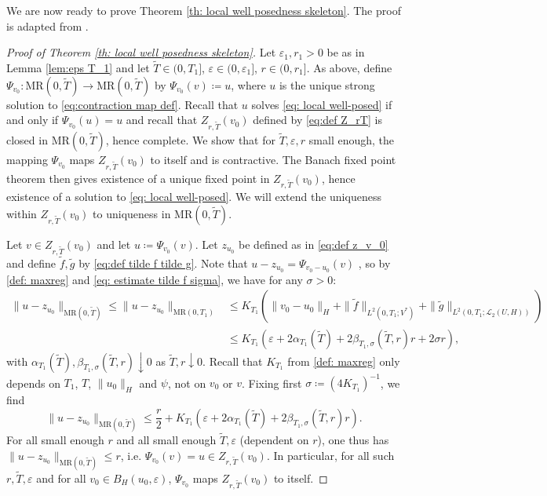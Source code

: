 \documentclass{amsart}
\renewcommand{\MR}{\mathrm{MR}}
\newcommand{\UH}{\mathcal{L}_2(U,H)}
\newcommand{\<}{\langle}
\newcommand{\?}{\rangle}
\theoremstyle{plain}
\theoremstyle{remark}
\theoremstyle{plain}
\numberwithin{equation}{section}
\newcommand{\eps}{\varepsilon}
\begin{document}
We are now ready to prove Theorem \ref{th: local well posedness skeleton}. The proof is adapted from \cite[Th. 18.2.6]{HNVWvolume3}.

\begin{proof}[Proof of Theorem \ref{th: local well posedness skeleton}]
Let  $\eps_1,r_1>0$ be as in Lemma \ref{lem:eps T_1} and let $\tilde{T}\in(0,T_1]$, $\eps\in(0,\eps_1]$, $r\in(0,r_1]$. As above, define $\Psi_{v_0}\colon \MR(0,\tilde{T})\to \MR(0,\tilde{T})$ by $\Psi_{v_0}(v)\coloneqq u$, where $u$ is the unique strong solution to \eqref{eq:contraction map def}. Recall that $u$ solves \eqref{eq: local well-posed} if and only if $\Psi_{v_0}(u)=u$ and recall that $Z_{r,\tilde{T}}(v_0)$ defined by \eqref{eq:def Z_rT} is closed in $\MR(0,\tilde{T})$, hence complete.
We show that for $\tilde{T},\eps,r$ small enough, the mapping $\Psi_{v_0}$ maps $Z_{r,\tilde{T}}(v_0)$ to itself and is contractive. The Banach fixed point theorem then gives existence of a unique fixed point in $Z_{r,\tilde{T}}(v_0)$, hence existence of a solution to \eqref{eq: local well-posed}. We will extend the uniqueness within $Z_{r,\tilde{T}}(v_0)$ to uniqueness in $\MR(0,\tilde{T})$.

Let $v\in Z_{r,\tilde{T}}(v_0)$ and let $u\coloneqq \Psi_{v_0}(v)$. Let $z_{u_0}$ be defined as in \eqref{eq:def z_v_0} and define $\tilde{f},\tilde{g}$ by \eqref{eq:def tilde f tilde g}.
Note that $u-z_{u_0}=\Psi_{v_0-u_0}(v)$ , so by \eqref{def: maxreg} and \eqref{eq: estimate tilde f sigma}, we have for any $\sigma>0$:
 \begin{align*}
  \|u-z_{u_0}\|_{\MR(0,\tilde{T})}\leq \|u-z_{u_0}\|_{\MR(0,T_1)}
  &\leq K_{T_1}\left(\|v_0-u_0\|_H+\|\tilde{f}\|_{L^2(0,T_1;V^*)}+\|\tilde{g}\|_{L^2(0,T_1;\UH)}\right)\\
  &\leq K_{T_1}\left(\eps+2\alpha_{T_1}(\tilde{T})+2\beta_{T_1,\sigma}(\tilde{T},r)r+2\sigma r\right), 
 \end{align*}
 with $\alpha_{T_1}(\tilde{T}),\beta_{T_1,\sigma}(\tilde{T},r)\downarrow 0$ as $\tilde{T},r\downarrow 0$. Recall that $K_{T_1}$ from \eqref{def: maxreg} only depends on $T_1$, $T$, $\|u_0\|_H$ and $\psi$, not on $v_0$ or $v$. 
Fixing first $\sigma\coloneqq (4K_{T_1})^{-1}$, we find 
 \[
 \|u-z_{u_0}\|_{\MR(0,\tilde{T})}\leq \frac{r}{2}+K_{T_1}\left(\eps+2\alpha_{T_1}(\tilde{T})+2\beta_{T_1,\sigma}(\tilde{T},r)r\right).
 \]
For all small enough $r$ and all small enough $\tilde{T},\eps$ (dependent on $r$), one thus  has $\|u-z_{u_0}\|_{\MR(0,\tilde{T})}\leq r$, i.e. $\Psi_{v_0}(v)=u\in Z_{r,\tilde{T}}(v_0)$.
In particular, for all such $r,\tilde{T},\eps$ and for all $v_0\in B_H(u_0,\eps)$,  $\Psi_{v_0}$ maps $Z_{r,\tilde{T}}(v_0)$ to itself.



\end{proof}
\end{document}
